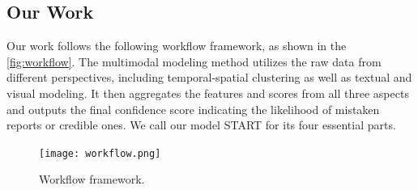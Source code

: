 \documentclass{mcmthesis}
\begin{document}
\subsection{Our Work}

Our work follows the following workflow framework, as shown in the \autoref{fig:workflow}. The multimodal modeling method utilizes the raw data from different perspectives, including temporal-spatial clustering as well as textual and visual modeling. It then aggregates the features and scores from all three aspects and outputs the final confidence score indicating the likelihood of mistaken reports or credible ones. We call our model START for its four essential parts.

\begin{figure}[h]
    \small
    \centering
    \texttt{[image: workflow.png]}
    \caption{Workflow framework.} \label{fig:workflow}
\end{figure}

\newpage
\end{document}
